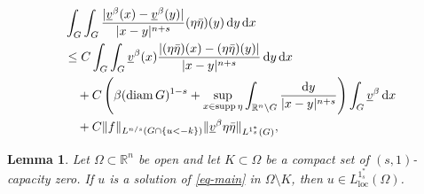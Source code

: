 \documentclass[10pt,a4paper]{amsart}
\newtheorem{lemma}{Lemma}
\begin{document}
\begin{equation}\label{eq-Caccio1-super}
\begin{split}
&\int_{G} \int_{G} \frac{|\underbar{$v$}^\beta(x) - \underbar{$v$}^\beta(y)|}{|x-y|^{n+s}} (\eta\bar{\eta})(y) \,\mathrm{d}y \,\mathrm{d}x \\
&\leq C \int_{G} \int_{G} \underbar{$v$}^\beta(x) \frac{|(\eta\bar{\eta})(x)-(\eta\bar{\eta})(y)|}{|x-y|^{n+s}} \,\mathrm{d}y \,\mathrm{d}x \\
&\quad + C \left( \beta (\mathrm{diam}\, G)^{1-s} + \sup_{x \in \mathrm{supp}\,\eta} \int_{\mathbb{R}^n \setminus G} \frac{\mathrm{d}y}{|x-y|^{n+s}} \right) \int_G \underbar{$v$}^\beta \,\mathrm{d}x \\
&\quad + C \|f\|_{L^{n/s}(G \cap \{u<-k\})} \|\underbar{$v$}^\beta\eta\bar{\eta}\|_{L^{1^{\ast}_s}(G)},
\end{split}
\end{equation}

\begin{lemma}\label{lem-step2}
Let $\Omega \subset \mathbb{R}^n$ be open and let $K \subset \Omega$ be a compact set of $(s, 1)$-capacity zero. If $u$ is a solution of \eqref{eq-main} in $\Omega \setminus K$, then $u \in L^{1^{\ast}_s}_{\mathrm{loc}}(\Omega)$.
\end{lemma}
\end{document}
